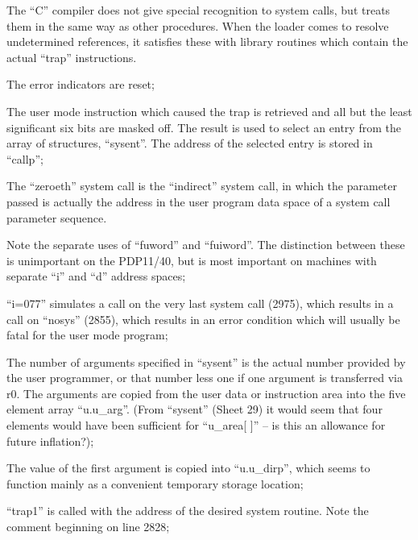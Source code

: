 The ``C'' compiler does not give special
recognition to system calls, but treats
them in the same way as other procedures. When the loader comes to
resolve undetermined references, it
satisfies these with library routines
which contain the actual ``trap''
instructions.

\bd
\item[2752:] The error indicators are reset;

\item[2754:] The user mode instruction which
 caused the trap is retrieved and
 all but the least significant six
 bits are masked off. The result
 is used to select an entry from
 the array of structures,
``sysent''. The address of the
selected entry is stored in
``callp'';


\item[2755:] The ``zeroeth'' system call is the
``indirect'' system call, in which
the parameter passed is actually
the address in the user program
data space of a system call
parameter sequence.
\ed

Note the separate uses of ``fuword'' and
``fuiword''. The distinction between
these is unimportant on the PDP11/40,
but is most important on machines with
separate ``i'' and ``d'' address spaces;

\bd
\item[2760:] ``i=077'' simulates a call on the
very last system call (2975),
which results in a call on
``nosys'' (2855), which results in
an error condition which will
usually be fatal for the user
mode program;

\item[2762:]
\item[2765:] The number of arguments specified
in ``sysent'' is the actual number
provided by the user programmer,
or that number less one if one
argument is transferred via r0.
The arguments are copied from the
user data or instruction area
into the five element array
``u.u\_arg''. (From ``sysent'' (Sheet
29) it would seem that four elements would have been sufficient
for ``u\_area[ ]'' -- is this an
allowance for future inflation?);

\item[2770:] The value of the first argument
is copied into ``u.u\_dirp'', which
seems to function mainly as a
convenient temporary storage
location;

\item[2771:] ``trap1'' is called with the
 address of the desired system
 routine. Note the comment beginning on line 2828;

